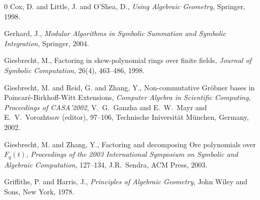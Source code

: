 \begin{thebibliography}{0}
Cox, D. and Little, J. and O'Shea, D., {\em Using Algebraic
Geometry}, Springer, 1998.







 Gerhard, J.,
{\em Modular Algorithms in Symbolic Summation and Symbolic
Integration}, Springer, 2004.


Giesbrecht, M., Factoring in skew-polynomial rings over finite
fields, {\em Journal of Symbolic Computation}, 26(4), 463--486,
1998.

Giesbrecht, M. and Reid, G. and Zhang, Y., Non-commutative
{G}r{\"o}bner bases in {P}oincar{\'e}-{B}irkhoff-{W}itt
Extensions, {\em Computer Algebra in Scientific  Computing,
Proceedings of CASA'2002}, V.~G.~Ganzha and E.~W.~Mayr and
E.~V.~Vorozhtsov (editor), 97--106, Technische Iniversit{\"a}t
M{\"u}nchen, Germany, 2002.



Giesbrecht, M. and Zhang, Y., Factoring and decomposing {O}re
polynomials over $F_q(t)$, {\em  Proceedings of the 2003
International Symposium on Symbolic and Algebraic Computation},
127--134, J.R.~Sendra, ACM Press, 2003.


Griffiths, P. and Harris, J., {\em Principles of Algebraic
Geometry},
 John Wiley and Sons, New York, 1978.


\end{thebibliography}
